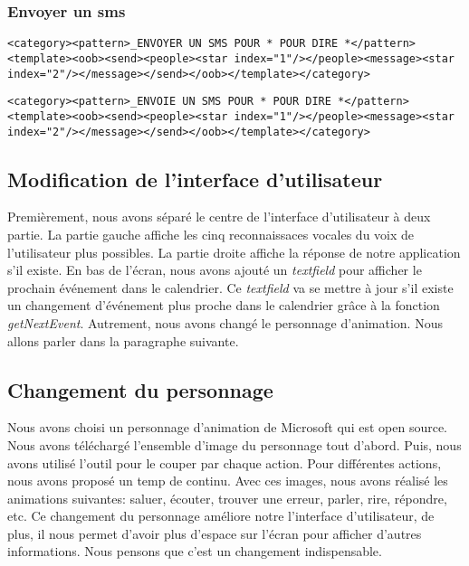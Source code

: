 \subsubsection{Envoyer un sms}
\begin{lstlisting}[frame=none,aboveskip=0.5em]
<category><pattern>_ENVOYER UN SMS POUR * POUR DIRE *</pattern><template><oob><send><people><star index="1"/></people><message><star index="2"/></message></send></oob></template></category>
\end{lstlisting}

\begin{lstlisting}[frame=none,aboveskip=0.5em]
<category><pattern>_ENVOIE UN SMS POUR * POUR DIRE *</pattern><template><oob><send><people><star index="1"/></people><message><star index="2"/></message></send></oob></template></category>
\end{lstlisting}



\subsection{Modification de l'interface d'utilisateur}
\indent Premièrement, nous avons séparé le centre de l'interface d'utilisateur à deux partie. La partie gauche affiche les cinq reconnaissaces vocales du voix de l'utilisateur plus possibles. La partie droite affiche la réponse de notre application s'il existe.
\indent En bas de l'écran, nous avons ajouté un \emph{textfield} pour afficher le prochain événement dans le calendrier. Ce \emph{textfield} va se mettre à jour s'il existe un changement d'événement plus proche dans le calendrier grâce à la fonction \emph{getNextEvent}.
\indent Autrement, nous avons changé le personnage d'animation. Nous allons parler dans la paragraphe suivante.

\subsection{Changement du personnage}
\indent Nous avons choisi un personnage d'animation de Microsoft qui est open source. Nous avons téléchargé l'ensemble d'image du personnage tout d'abord. Puis, nous avons utilisé l'outil pour le couper par chaque action. Pour différentes actions, nous avons proposé un temp de continu. Avec ces images, nous avons réalisé les animations  suivantes: saluer, écouter, trouver une  erreur, parler, rire, répondre, etc. Ce changement du personnage améliore notre l'interface d'utilisateur, de plus, il nous permet d'avoir plus d'espace sur l'écran pour afficher d'autres informations. Nous pensons que c'est un changement indispensable.
